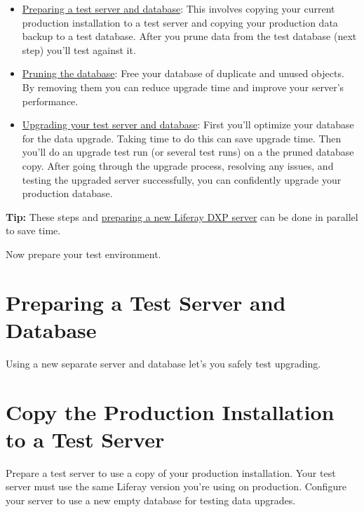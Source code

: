\begin{itemize}
\item
  \hyperref[preparing-a-test-server-and-database]{Preparing a test
  server and database}: This involves copying your current production
  installation to a test server and copying your production data backup
  to a test database. After you prune data from the test database (next
  step) you'll test against it.
\item
  \href{/docs/7-2/deploy/-/knowledge_base/d/pruning-the-database}{Pruning
  the database}: Free your database of duplicate and unused objects. By
  removing them you can reduce upgrade time and improve your server's
  performance.
\item
  \href{/docs/7-2/deploy/-/knowledge_base/d/upgrading-your-test-server-and-database}{Upgrading
  your test server and database}: First you'll optimize your database
  for the data upgrade. Taking time to do this can save upgrade time.
  Then you'll do an upgrade test run (or several test runs) on a the
  pruned database copy. After going through the upgrade process,
  resolving any issues, and testing the upgraded server successfully,
  you can confidently upgrade your production database.
\end{itemize}

\noindent\hrulefill

\textbf{Tip:} These steps and
\href{/docs/7-2/deploy/-/knowledge_base/d/preparing-a-new-product-server-for-data-upgrade}{preparing
a new Liferay DXP server} can be done in parallel to save time.

\noindent\hrulefill

Now prepare your test environment.

\section{Preparing a Test Server and
Database}\label{preparing-a-test-server-and-database}

Using a new separate server and database let's you safely test
upgrading.

\section{Copy the Production Installation to a Test
Server}\label{copy-the-production-installation-to-a-test-server}

Prepare a test server to use a copy of your production installation.
Your test server must use the same Liferay version you're using on
production. Configure your server to use a new empty database for
testing data upgrades.

